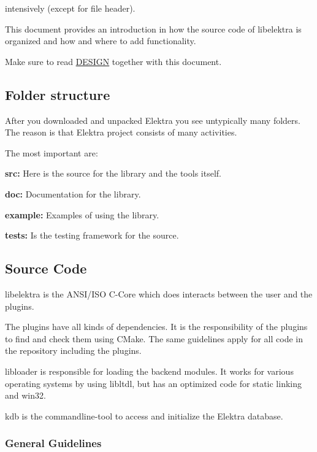 intensively (except for file header).

This document provides an introduction in how the source code of libelektra is organized and how and where to add functionality.

Make sure to read \hyperlink{doc_DESIGN_md}{D\+E\+S\+I\+G\+N} together with this document.

\subsection*{Folder structure}

After you downloaded and unpacked Elektra you see untypically many folders. The reason is that Elektra project consists of many activities.

The most important are\+:


\begin{DoxyItemize}
\item {\bfseries src\+:} Here is the source for the library and the tools itself.
\item {\bfseries doc\+:} Documentation for the library.
\item {\bfseries example\+:} Examples of using the library.
\item {\bfseries tests\+:} Is the testing framework for the source.
\end{DoxyItemize}

\subsection*{Source Code}

libelektra is the A\+N\+S\+I/\+I\+S\+O C-\/\+Core which does interacts between the user and the plugins.

The plugins have all kinds of dependencies. It is the responsibility of the plugins to find and check them using C\+Make. The same guidelines apply for all code in the repository including the plugins.

{\ttfamily libloader} is responsible for loading the backend modules. It works for various operating systems by using {\ttfamily libltdl}, but has an optimized code for static linking and win32.

kdb is the commandline-\/tool to access and initialize the Elektra database.

\subsubsection*{General Guidelines}

